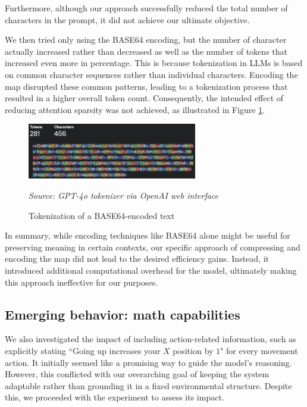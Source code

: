 Furthermore, although our approach successfully reduced the total number of
characters in the prompt, it did not achieve our ultimate objective.

We then tried only using the BASE64 encoding, but the number of character
actually increased rather than decreased as well as the number of tokens that
increased even more in percentage. This is because tokenization in LLMs is based
on common character sequences rather than individual characters. Encoding the
map disrupted these common patterns, leading to a tokenization process that resulted
in a higher overall token count. Consequently, the intended effect of reducing attention
sparsity was not achieved, as illustrated in Figure \ref{fig:lesscharmoretokens}.

\vspace{5mm}
\begin{figure}[ht!]
  \centering
  \includegraphics[width=0.66\textwidth]{
    images/data_collection/lesscharmoretokens.png
  }
  \caption{Tokenization of a BASE64-encoded text}
  {\emph{Source: GPT-4o tokenizer via OpenAI web interface}} \label{fig:lesscharmoretokens}
\end{figure}
\vspace{5mm}

In summary, while encoding techniques like BASE64 alone might be useful for
preserving meaning in certain contexts, our specific approach of compressing and
encoding the map did not lead to the desired efficiency gains. Instead, it introduced
additional computational overhead for the model, ultimately making this approach
ineffective for our purposes.

\subsection{Emerging behavior: math capabilities}

We also investigated the impact of including action-related information, such as
explicitly stating ``Going up increases your $X$ position by $1$" for every movement
action. It initially seemed like a promising way to guide the model's reasoning.
However, this conflicted with our overarching goal of keeping the system
adaptable rather than grounding it in a fixed environmental structure. Despite this,
we proceeded with the experiment to assess its impact.

